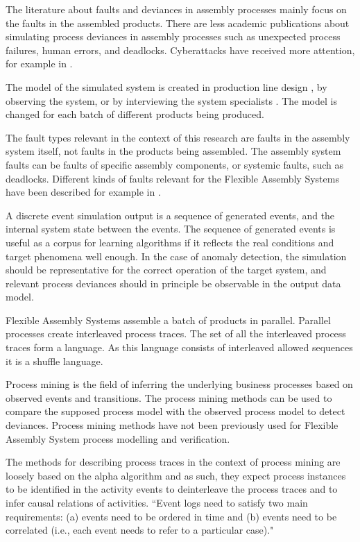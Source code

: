 \documentclass[a4paper,10pt]{article}
\begin{document}
The literature about faults and deviances in assembly processes mainly focus on the faults in the assembled products.
There are less academic publications about simulating process deviances in assembly processes such as unexpected process failures, human errors, and deadlocks.
Cyberattacks have received more attention, for example in \cite{wu2015method}.

The model of the simulated system is created in production line design \cite{bullinger}, by observing the system, or by interviewing the system specialists \cite{montevechi2012using}.
The model is changed for each batch of different products being produced.

The fault types relevant in the context of this research are faults in the assembly system itself, not faults in the products being assembled.
The assembly system faults can be faults of specific assembly components, or systemic faults, such as deadlocks.
Different kinds of faults relevant for the Flexible Assembly Systems have been described for example in \cite{cong1997fault}.

A discrete event simulation output is a sequence of generated events,
and the internal system state between the events. The sequence of generated events is useful as a corpus for learning algorithms if it reflects the real conditions and
target phenomena well enough. In the case of anomaly detection, the simulation should be representative for the correct operation of the target system, and relevant process deviances
should in principle be observable in the output data model.

Flexible Assembly Systems assemble a batch of products in parallel.
Parallel processes create interleaved process traces. The set of all the interleaved process traces form a language. As this language consists of interleaved allowed sequences
it is a shuffle language\cite{berglund2011recognizing}.

Process mining is the field of inferring the underlying business processes based on observed events and transitions. The process mining methods can be used
to compare the supposed process model with the observed process model to detect deviances. Process mining methods have not been previously used for
Flexible Assembly System process modelling and verification.

The methods for describing process traces in the context of process mining are loosely based on the alpha algorithm\cite{van2004workflow} and as such, they expect process instances
to be identified in the activity events to deinterleave the process traces and to infer causal relations of activities.
``Event logs need to satisfy two main requirements: (a) events need to be ordered in time and (b) events need to be correlated
(i.e., each event needs to refer to a particular case)."\cite{van2011process}
\end{document}
